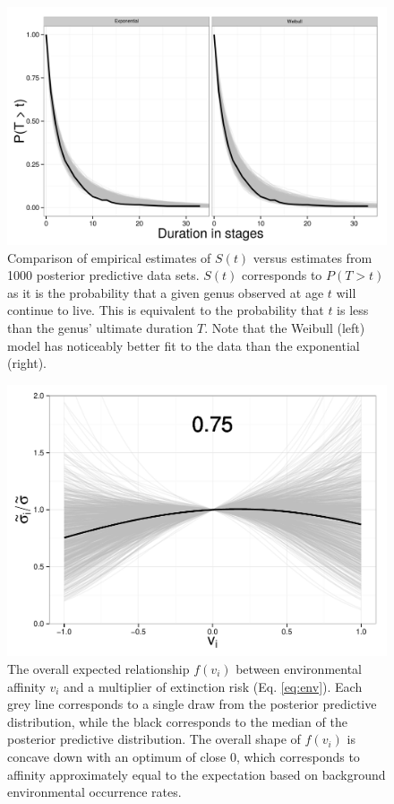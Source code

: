 \documentclass{article}
\begin{document}
\begin{figure}[ht]
  \centering
  \includegraphics[height = 0.5\textheight,width=\textwidth,keepaspectratio=true]{figure/survival_curves}
  \caption{Comparison of empirical estimates of \(S(t)\) versus estimates from 1000 posterior predictive data sets. \(S(t)\) corresponds to \(P(T > t)\) as it is the probability that a given genus observed at age \(t\) will continue to live. This is equivalent to the probability that \(t\) is less than the genus' ultimate duration \(T\). Note that the Weibull (left) model has noticeably better fit to the data than the exponential (right).}
  \label{fig:surv}
\end{figure}

\begin{figure}[ht]
  \centering
  \includegraphics[height = 0.5\textheight,width=\textwidth,keepaspectratio=true]{figure/environ_quad}
  \caption{The overall expected relationship \(f(v_{i})\) between environmental affinity \(v_{i}\) and a multiplier of extinction risk (Eq. \ref{eq:env}). Each grey line corresponds to a single draw from the posterior predictive distribution, while the black corresponds to the median of the posterior predictive distribution. The overall shape of \(f(v_{i})\) is concave down with an optimum of close 0, which corresponds to affinity approximately equal to the expectation based on background environmental occurrence rates.}
  \label{fig:env_mean}
\end{figure}
\end{document}
